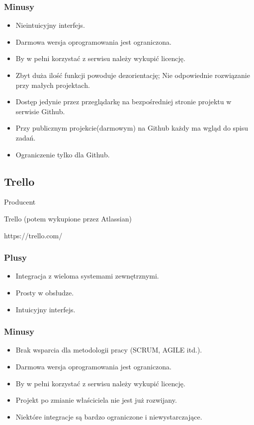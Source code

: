\documentclass[eng,printmode]{mgr}
\begin{document}
\subsubsection{Minusy}
\begin{itemize}
  \item[--] Nieintuicyjny interfejs.
  \item[--] Darmowa wersja oprogramowania jest ograniczona.
  \item[--] By w pełni korzystać z serwisu należy wykupić licencję.
  \item[--] Zbyt duża ilość funkcji powoduje dezorientację; Nie odpowiednie rozwiązanie przy małych projektach.
  \item[--] Dostęp jedynie przez przeglądarkę na bezpośredniej stronie projektu w serwisie Github.
  \item[--] Przy publicznym projekcie(darmowym) na Github każdy ma wgląd do spisu zadań.
  \item[--] Ograniczenie tylko dla Github.
\end{itemize}

\subsection{Trello}
\begin{labeling}{Producent}
\item [Producent:] Trello (potem wykupione przez Atlassian)
\item [Link:] https://trello.com/
\end{labeling}
\subsubsection{Plusy}
\begin{itemize}
  \item[--] Integracja z wieloma systemami zewnętrznymi.
  \item[--] Prosty w obsłudze.
  \item[--] Intuicyjny interfejs.
\end{itemize}
\subsubsection{Minusy}
\begin{itemize}
  \item[--] Brak wsparcia dla metodologii pracy (SCRUM, AGILE itd.).
  \item[--] Darmowa wersja oprogramowania jest ograniczona.
  \item[--] By w pełni korzystać z serwisu należy wykupić licencję.
  \item[--] Projekt po zmianie właściciela nie jest już rozwijany.
  \item[--] Niektóre integracje są bardzo ograniczone i niewystarczające.
\end{itemize}
\end{document}
